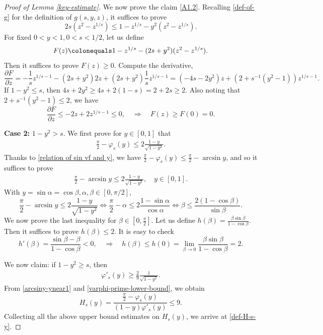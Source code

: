 \documentclass[reqno,10pt]{amsart}
\let\pa=\partial
\let\al=\alpha
\let\vf=\varphi
\def\pa{\partial}
\newcommand{\ben}{\begin{eqnarray}}
\newcommand{\een}{\end{eqnarray}}
\newcommand{\beno}{\begin{eqnarray*}}
\newcommand{\eeno}{\end{eqnarray*}}
\theoremstyle{definition}
\numberwithin{equation}{section}
\begin{document}
\begin{proof}[Proof of Lemma \ref{key-estimate}]
	
We now prove the claim \eqref{A1.2}. Recalling \eqref{def-of-g} for the definition of $g(s,y,z)$,
		it suffices to prove
		$$
		2s(z^2-z^{1/s})\le 1-z^{1/s}-y^2(z^2-z^{1/s}).
		$$
	 For fixed $0 <y< 1, 0<s<1/2$,	let us define
		\beno
		F(z) \colonequals 1-z^{1/s}-(2s+y^2)(z^2-z^{1/s}).
		\eeno 
		Then 	it suffices to prove $F(z) \geq 0$. Compute the derivative,
		$$\frac{\pa F}{\pa z}=-\frac{1}{s}z^{1/s-1}-(2s+y^2)2z+(2s+y^2)\frac{1}{s}z^{1/s-1}=(-4s-2y^2)z+
		(2+s^{-1}(y^2-1))z^{1/s-1}.$$
		If  $1-y^2\le s$, then
		 $4s+2y^2 \geq 4s + 2(1-s) = 2+2s \geq 2$. Also noting that
	 $2+s^{-1}(y^2-1) \leq 2$, we have
		$$\frac{\pa F}{\pa z}\le -2z+2z^{1/s-1}\le 0,
		\quad \Longrightarrow \quad F(z)\ge F(0)=0.$$
	

	\textbf{Case 2:} $1-y^2> s$. We first prove for $y \in [0,1]$ that
		\ben\label{arcsiny-ynear1}
	\frac{\pi}{2}-\vf_s(y)\le 2\frac{1-y}{\sqrt{1-y^2}}.
	\een
	Thanks to \eqref{relation of sin vf and y}, we have
	$\frac{\pi}{2}-\vf_s(y)\le \frac{\pi}{2}-\arcsin y$, and so it suffices to prove
	\ben\label{A.3}
	\frac{\pi}{2}-\arcsin y\le 2\frac{1-y}{\sqrt{1-y^2}}, \quad  y \in [0,1].
	\een
	With $y=\sin \alpha = \cos \beta, \alpha,\beta \in[0,\pi/2]$,  
	$$\frac{\pi}{2}-\arcsin y\le 2\frac{1-y}{\sqrt{1-y^2}}\iff \frac{\pi}{2}-\al\le 2\frac{1-\sin\al}{\cos\al}\iff \beta\le \frac{2(1-\cos\beta)}{\sin\beta}.$$
	We now prove the last inequality for $\beta\in[0,\frac{\pi}{2}]$.
	Let us define
	$h(\beta)=\frac{\beta\sin\beta}{1-\cos\beta}$. 	Then it suffices to prove $h(\beta) \leq 2$. 
	It is easy to check
	$$h'(\beta)=\frac{\sin\beta-\beta}{1-\cos\beta}<0, 	\quad \Longrightarrow \quad  h(\beta)\le h(0)=\lim\limits_{\beta\to0}\frac{\beta\sin\beta}{1-\cos\beta}=2.$$



 We now claim: if $1-y^2\ge s$, then
	\ben \label{varphi-prime-lower-bound}
	\vf'_s(y)\ge \frac{2}{9}\frac{1}{\sqrt{1-y^2}}.
	\een
	From \eqref{arcsiny-ynear1} and \eqref{varphi-prime-lower-bound}, we obtain
	$$H_s(y)=\frac{\frac{\pi}{2}-\vf_s(y)}{(1-y)\vf'_s(y)}\le 9.$$
Collecting all the above upper bound estimates on $H_s(y)$, we arrive at \eqref{def-H-s-y}.
	

\end{proof}
\end{document}
